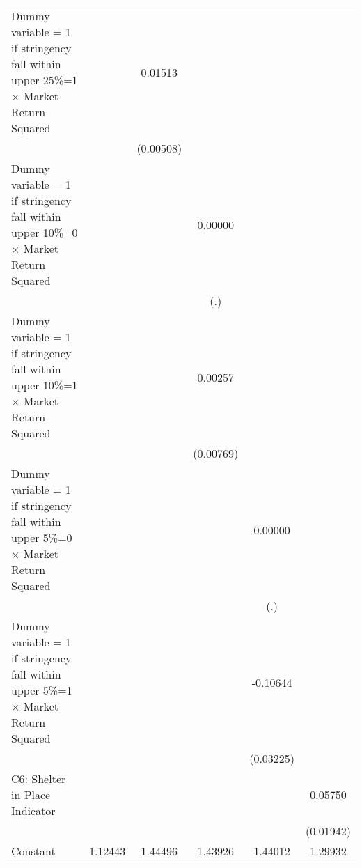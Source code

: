 \begin{table}[htbp]
\begin{tabular}{l*{5}{c}}
\addlinespace
Dummy variable = 1 if stringency fall within upper 25\%=1 $\times$ Market Return Squared&                     &     0.01513\sym{***}&                     &                     &                     \\
                    &                     &   (0.00508)         &                     &                     &                     \\
\addlinespace
Dummy variable = 1 if stringency fall within upper 10\%=0 $\times$ Market Return Squared&                     &                     &     0.00000         &                     &                     \\
                    &                     &                     &         (.)         &                     &                     \\
\addlinespace
Dummy variable = 1 if stringency fall within upper 10\%=1 $\times$ Market Return Squared&                     &                     &     0.00257         &                     &                     \\
                    &                     &                     &   (0.00769)         &                     &                     \\
\addlinespace
Dummy variable = 1 if stringency fall within upper 5\%=0 $\times$ Market Return Squared&                     &                     &                     &     0.00000         &                     \\
                    &                     &                     &                     &         (.)         &                     \\
\addlinespace
Dummy variable = 1 if stringency fall within upper 5\%=1 $\times$ Market Return Squared&                     &                     &                     &    -0.10644\sym{***}&                     \\
                    &                     &                     &                     &   (0.03225)         &                     \\
\addlinespace
C6: Shelter in Place Indicator&                     &                     &                     &                     &     0.05750\sym{***}\\
                    &                     &                     &                     &                     &   (0.01942)         \\
\addlinespace
Constant            &     1.12443\sym{***}&     1.44496\sym{***}&     1.43926\sym{***}&     1.44012\sym{***}&     1.29932\sym{***}\\

\end{tabular}
\end{table}
